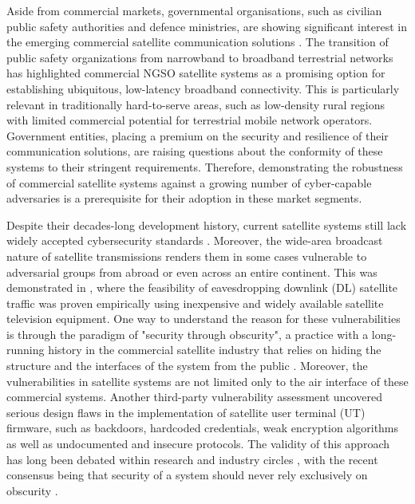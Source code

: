 \documentclass[english, 12pt, a4paper, elec, utf8, a-1b, online]{aaltothesis}
\begin{document}
Aside from commercial markets, governmental organisations, such as civilian public safety authorities and defence ministries, are showing significant interest in the emerging commercial satellite communication solutions \cite{erve-teknologiatrendit-2022}.
The transition of public safety organizations from narrowband to broadband terrestrial networks has highlighted commercial NGSO satellite systems as a promising option for establishing ubiquitous, low-latency broadband connectivity.
This is particularly relevant in traditionally hard-to-serve areas, such as low-density rural regions with limited commercial potential for terrestrial mobile network operators.
Government entities, placing a premium on the security and resilience of their communication solutions, are raising questions about the conformity of these systems to their stringent requirements.
Therefore, demonstrating the robustness of commercial satellite systems against a growing number of cyber-capable adversaries is a prerequisite for their adoption in these market segments.

Despite their decades-long development history, current satellite systems still lack widely accepted cybersecurity standards \cite{lin2022defending}.
Moreover, the wide-area broadcast nature of satellite transmissions renders them in some cases vulnerable to adversarial groups from abroad or even across an entire continent.
This was demonstrated in \cite{pavur2020tale}, where the feasibility of eavesdropping downlink (DL) satellite traffic was proven empirically using inexpensive and widely available satellite television equipment.
One way to understand the reason for these vulnerabilities is through the paradigm of "security through obscurity", a practice with a long-running history in the commercial satellite industry that relies on hiding the structure and the interfaces of the system from the public \cite{lin2022defending}.
Moreover, the vulnerabilities in satellite systems are not limited only to the air interface of these commercial systems.
Another third-party vulnerability assessment \cite{santamarta2014wake} uncovered serious design flaws in the implementation of satellite user terminal (UT) firmware, such as backdoors, hardcoded credentials, weak encryption algorithms as well as undocumented and insecure protocols.
The validity of this approach has long been debated within research and industry circles \cite{johansson2008great}, with the recent consensus being that security of a system should never rely exclusively on obscurity \cite{diehl2016law, guo2018defending}.
\end{document}

